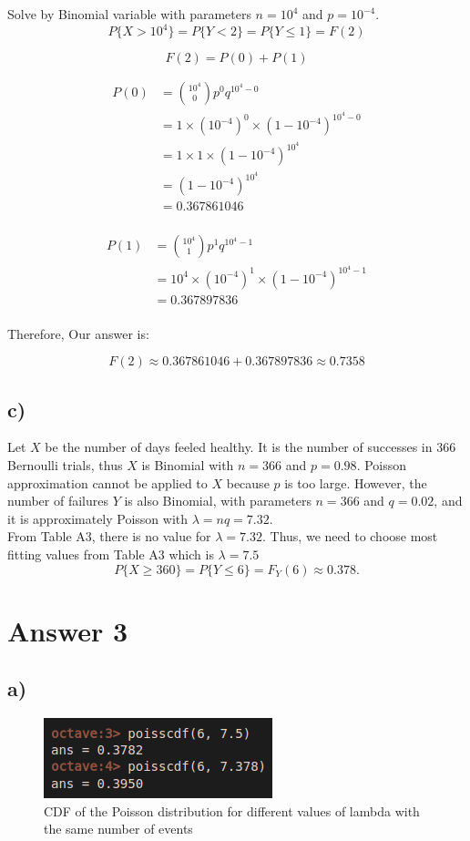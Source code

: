 \documentclass[12pt]{article}
\begin{document}
Solve by Binomial variable with parameters \( n = 10^4 \) and \( p = 10^{-4} \).
\[ P\{X > 10^4\} = P\{Y < 2\} = P\{Y \leq 1\} = F(2) \]

\[ F(2) = P(0) + P(1) \]

\begin{align*}
P(0) &=   \binom{10^4}{0} p^0 q^{10^4-0}\\
     &=   1 \times (10^{-4})^0 \times (1-10^{-4})^{10^4-0} \\
     &=   1 \times 1 \times (1-10^{-4})^{10^4} \\
     &=   (1-10^{-4})^{10^4} \\
     &=   0.367861046\\
\end{align*}

\begin{align*}
P(1) &=   \binom{10^4}{1} p^1 q^{10^4-1}\\
     &=   10^4 \times (10^{-4})^1 \times (1-10^{-4})^{10^4-1} \\
     &=   0.367897836\\
\end{align*}

Therefore, Our answer is:

\[ F(2) \approx 0.367861046 + 0.367897836 \approx 0.7358\]

\subsection*{c)} 

Let \( X \) be the number of days feeled healthy. It is the number of successes in 366 Bernoulli trials, thus \( X \) is Binomial with \( n = 366 \) and \( p = 0.98 \). Poisson approximation cannot be applied to \( X \) because \( p \) is too large. However, the number of failures \( Y \) is also Binomial, with parameters \( n = 366 \) and \( q = 0.02 \), and it is approximately Poisson with \( \lambda = nq = 7.32 \). \\

From Table A3, there is no value for $\lambda =7.32 $. Thus, we need to choose most fitting values from Table A3 which is $\lambda =7.5 $
\[ P \{X \geq 360\} = P \{Y \leq 6\} = F_Y(6) \approx 0.378. \]


\section*{Answer 3}
\subsection*{a)} 
\begin{figure}[h]
    \centering
    \includegraphics{3a_kod}
    \caption{CDF of the Poisson distribution for different values of lambda with the same number of events}
\end{figure}
\end{document}
